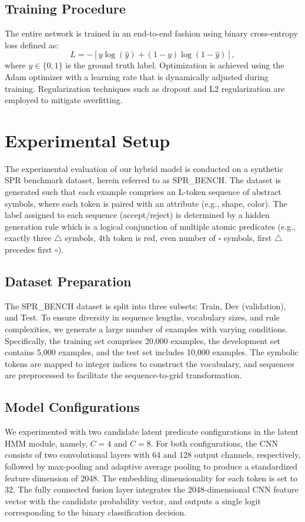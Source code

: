 \documentclass[11pt]{article}
\begin{document}
\subsection{Training Procedure}
The entire network is trained in an end-to-end fashion using binary cross-entropy loss defined as:
\[
L = -\left[y \log(\hat{y}) + (1-y) \log(1-\hat{y})\right],
\]
where \(y \in \{0,1\}\) is the ground truth label. Optimization is achieved using the Adam optimizer with a learning rate that is dynamically adjusted during training. Regularization techniques such as dropout and L2 regularization are employed to mitigate overfitting.

\section{Experimental Setup}
The experimental evaluation of our hybrid model is conducted on a synthetic SPR benchmark dataset, herein referred to as SPR\_BENCH. The dataset is generated such that each example comprises an L-token sequence of abstract symbols, where each token is paired with an attribute (e.g., shape, color). The label assigned to each sequence (accept/reject) is determined by a hidden generation rule which is a logical conjunction of multiple atomic predicates (e.g., exactly three \(\triangle\) symbols, 4th token is red, even number of \(\square\) symbols, first \(\triangle\) precedes first \(\circ\)).

\subsection{Dataset Preparation}
The SPR\_BENCH dataset is split into three subsets: Train, Dev (validation), and Test. To ensure diversity in sequence lengths, vocabulary sizes, and rule complexities, we generate a large number of examples with varying conditions. Specifically, the training set comprises 20,000 examples, the development set contains 5,000 examples, and the test set includes 10,000 examples. The symbolic tokens are mapped to integer indices to construct the vocabulary, and sequences are preprocessed to facilitate the sequence-to-grid transformation.

\subsection{Model Configurations}
We experimented with two candidate latent predicate configurations in the latent HMM module, namely, \(C=4\) and \(C=8\). For both configurations, the CNN consists of two convolutional layers with 64 and 128 output channels, respectively, followed by max-pooling and adaptive average pooling to produce a standardized feature dimension of 2048. The embedding dimensionality for each token is set to 32. The fully connected fusion layer integrates the 2048-dimensional CNN feature vector with the candidate probability vector, and outputs a single logit corresponding to the binary classification decision.
\end{document}
